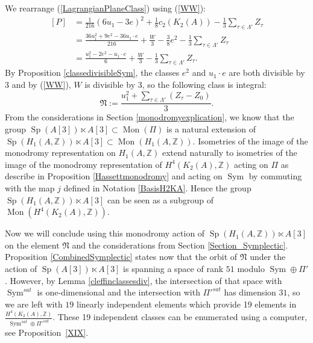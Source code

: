 \documentclass{alggeom}
\DeclareMathOperator{\Sym}{Sym}
\DeclareMathOperator{\Sp}{Sp}
\DeclareMathOperator{\Mon}{Mon}
\newcommand{\kum}[2]{K_{ #2 }( #1 )}
\newcommand{\X}{\kum{A}{2}}
\newcommand{\cc}{c_2(\X)}
\newcommand{\Z}{\mathbb{Z}}
\newcommand{\Ft}{\mathbb{F}_{3}}
\theoremstyle{plain}
\theoremstyle{definition}
\theoremstyle{remark}
\begin{document}
We rearrange (\ref{LagrangianPlaneClass}) using (\ref{WW}):
\begin{align*}
\left[P\right]&=\frac{1}{216}(6u_1-3e)^2+\frac{1}{8}\cc-\frac{1}{3}\sum_{\tau\in \Lambda'} Z_{\tau}\\
&=\frac{36u_1^2+9e^2-36u_1\cdot e}{216} +\frac{W}{3}-\frac{3}{8}e^2-\frac{1}{3}\sum_{\tau\in \Lambda'} Z_{\tau}\\
&=\frac{u_1^2-2e^2-u_1\cdot e}{6} +\frac{W}{3}-\frac{1}{3}\sum_{\tau\in \Lambda'} Z_{\tau}.
\end{align*}
By Proposition \ref{classedivisibleSym}, the classes $e^2$ and $u_1\cdot e$ are both divisible by 3 and by (\ref{WW}), $W$ is divisible by 3, so the following class is integral:
$$
\mathfrak{N}:=\frac{u_1^2+\sum_{\tau\in \Lambda'} (Z_{\tau}-Z_0)}{3}
.
$$
From the considerations in Section \ref{monodromyexplication}, we know that the group $\Sp(A[3])\ltimes A[3]\subset \Mon(\Pi)$ is a natural extension of 
$\Sp(H_1(A,\Z))\ltimes A[3]\subset \Mon(H_1(A,\Z))$. Isometries of the image of the monodromy representation on $H_1(A,\Z)$ extend naturally to isometries of the image of the monodromy representation of $H^4(K_2(A),\Z)$ acting on $\Pi$ as describe in Proposition \ref{Hassettmonodromy} and acting on $\Sym$ by commuting with the map $j$ defined in Notation \ref{BasisH2KA}.
Hence the group $\Sp(H_1(A,\Z))\ltimes A[3]$ can be seen as a subgroup of $\Mon(H^4(K_2(A),\Z))$. 

Now we will conclude using this monodromy action of $\Sp(H_1(A,\Z))\ltimes A[3]$ on the element $\mathfrak{N}$ and the considerations from Section \ref{Section_Symplectic}. 
Proposition \ref{CombinedSymplectic} states now that
the orbit of $\mathfrak{N}$ under the action of $\Sp(A[3])\ltimes A[3]$ is spanning a space of rank $51$ modulo $\Sym\oplus\Pi'$. However, by Lemma \ref{cleffinclassesdiv}, the intersection of that space with $\Sym^{sat}$ is one-dimensional and the intersection with $\Pi'^{sat}$ has dimension $31$, so we are left with $19$ linearly independent elements which provide 19 elements in $\frac{H^4(K_2(A),\Z)}{\Sym^{sat}\oplus\Pi'^{sat}}$.
These 19 independent classes can be enumerated using a computer, see Proposition~\ref{XIX}. 
\end{document}
